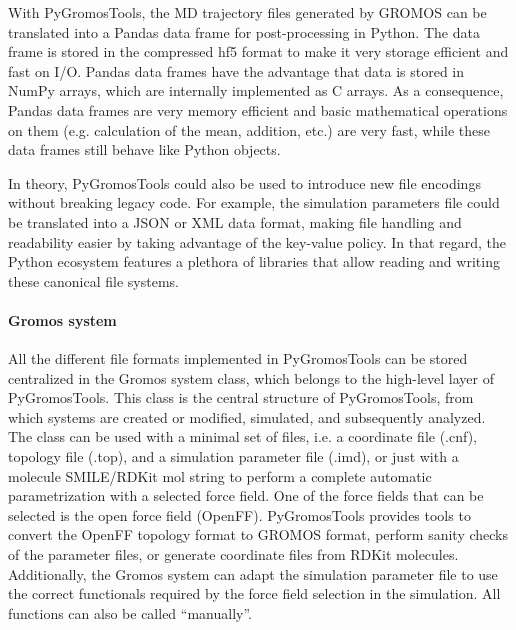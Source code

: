 With PyGromosTools, the MD trajectory files generated by GROMOS can be translated into a Pandas data frame for post-processing in Python. The data frame is stored in the compressed hf5 format \cite{Hf52020} to make it very storage efficient and fast on I/O. Pandas data frames have the advantage that data is stored in NumPy arrays, which are internally implemented as C arrays. As a consequence, Pandas data frames are very memory efficient and basic mathematical operations on them (e.g. calculation of the mean, addition, etc.) are very fast, while these data frames still behave like Python objects.

In theory, PyGromosTools could also be used to introduce new file encodings without breaking legacy code. For example, the simulation parameters file could be translated into a JSON\cite{Pezoa2016} or XML\cite{Bray2008} data format, making file handling and readability easier by taking advantage of the key-value policy. In that regard, the Python ecosystem features a plethora of libraries that allow reading and writing these canonical file systems.



\paragraph{Gromos system}
All the different file formats implemented in PyGromosTools can be stored centralized in the Gromos system class, which belongs to the high-level layer of PyGromosTools. This class is the central structure of PyGromosTools, from which systems are created or modified, simulated, and subsequently analyzed. The class can be used with a minimal set of files, i.e. a coordinate file (.cnf), topology file (.top), and a simulation parameter file (.imd), or just with a molecule SMILE/RDKit mol string to perform a complete automatic parametrization with a selected force field.
%
One of the force fields that can be selected is the open force field (OpenFF).\cite{Qiu2021} PyGromosTools provides tools to convert the OpenFF topology format to GROMOS format, perform sanity checks of the parameter files, or generate coordinate files from RDKit molecules. Additionally, the Gromos system can adapt the simulation parameter file to use the correct functionals required by the force field selection in the simulation.
All functions can also be called ``manually''.

